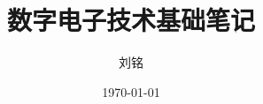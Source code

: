 \documentclass{article}
\title{数字电子技术基础笔记}
\author{刘铭}
\date{\today}
\begin{document}
\begin{titlepage}
    \maketitle
    \thispagestyle{empty}
\end{titlepage}

\newpage
{}
\tableofcontents
\newpage
{}
\setcounter{page}{1}


\end{document}
